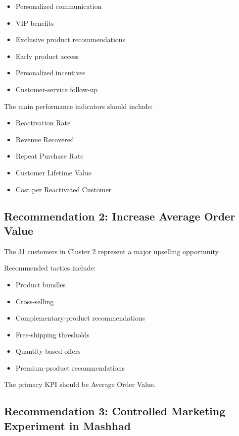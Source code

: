\documentclass[11pt,a4paper]{article}
\begin{document}
\begin{itemize}
    \item Personalized communication
    \item VIP benefits
    \item Exclusive product recommendations
    \item Early product access
    \item Personalized incentives
    \item Customer-service follow-up
\end{itemize}

The main performance indicators should include:

\begin{itemize}
    \item Reactivation Rate
    \item Revenue Recovered
    \item Repeat Purchase Rate
    \item Customer Lifetime Value
    \item Cost per Reactivated Customer
\end{itemize}

\subsection{Recommendation 2: Increase Average Order Value}

The 31 customers in Cluster 2 represent a major upselling opportunity.

Recommended tactics include:

\begin{itemize}
    \item Product bundles
    \item Cross-selling
    \item Complementary-product recommendations
    \item Free-shipping thresholds
    \item Quantity-based offers
    \item Premium-product recommendations
\end{itemize}

The primary KPI should be Average Order Value.

\subsection{Recommendation 3: Controlled Marketing Experiment in Mashhad}
\end{document}
